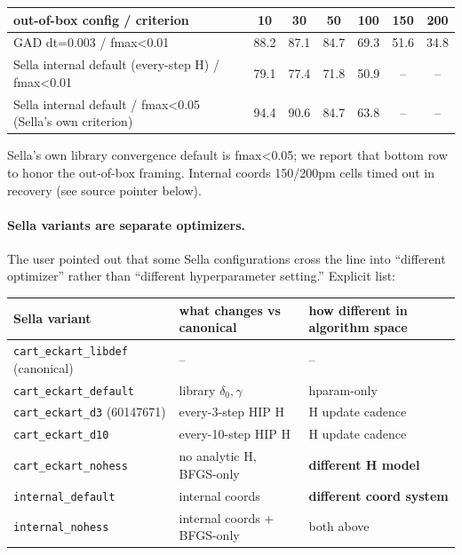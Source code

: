 \documentclass[11pt]{article}
\begin{document}
\begin{center}\small
\begin{tabular}{l|cccccc}
\toprule
out-of-box config / criterion                                  & 10 & 30 & 50 & 100 & 150 & 200 \\
\midrule
GAD dt=0.003 / fmax<0.01                                  & 88.2 & 87.1 & 84.7 & 69.3 & 51.6 & 34.8 \\
Sella internal default (every-step H) / fmax<0.01         & 79.1 & 77.4 & 71.8 & 50.9 & --   & --   \\
Sella internal default / fmax<0.05 (Sella's own criterion)     & 94.4 & 90.6 & 84.7 & 63.8 & --   & --   \\
\bottomrule
\end{tabular}
\end{center}
{\small Sella's own library convergence default is fmax<0.05; we report
that bottom row to honor the out-of-box framing. Internal coords 150/200pm
cells timed out in recovery (see source pointer below).}

\paragraph{Sella variants are separate optimizers.} The user pointed out
that some Sella configurations cross the line into ``different optimizer''
rather than ``different hyperparameter setting.'' Explicit list:

\begin{center}\small
\begin{tabular}{l|p{4.5cm}|p{4.0cm}}
\toprule
Sella variant & what changes vs canonical & how different in algorithm space \\
\midrule
\texttt{cart\_eckart\_libdef} (canonical)   & --                                       & -- \\
\texttt{cart\_eckart\_default}              & library $\delta_0,\gamma$                & hparam-only \\
\texttt{cart\_eckart\_d3} (60147671)        & every-3-step HIP H                       & H update cadence \\
\texttt{cart\_eckart\_d10}                  & every-10-step HIP H                      & H update cadence \\
\texttt{cart\_eckart\_nohess}               & no analytic H, BFGS-only                 & \textbf{different H model} \\
\texttt{internal\_default}                  & internal coords                          & \textbf{different coord system} \\
\texttt{internal\_nohess}                   & internal coords + BFGS-only              & both above \\
\bottomrule
\end{tabular}
\end{center}
\end{document}
